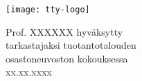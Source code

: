 \makeatletter
\let\thetitle\@title
\let\theauthor\@author
\makeatother

\thispagestyle{empty}

\vspace*{-.5cm}\noindent


\texttt{[image: tty-logo]}

\vspace{6.8cm}

\MakeUppercase{{\large\textbf{\textsf{%
\uppercase{\theauthor}\newline
\thetitle\newline
}}}}
\textsf{\documenttype{}}

\vspace{8.7cm} %

\begin{flushright}

\begin{minipage}[c]{6.8cm}
\begin{spacing}{1.0}
\textsf{Prof. XXXXXX hyväksytty}\\
\textsf{tarkastajaksi tuotantotalouden}\\
\textsf{osastoneuvoston kokouksessa}\\
\textsf{xx.xx.xxxx}\\
\end{spacing}
\end{minipage}
\end{flushright}